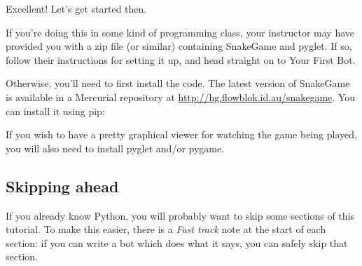 Excellent! Let’s get started then.

If you’re doing this in some kind of programming class, your instructor may have
provided you with a zip file (or similar) containing SnakeGame and pyglet.
If so, follow their instructions for setting it up, and head straight on to
Your First Bot.

Otherwise, you’ll need to first install the code. The latest version of
SnakeGame is available in a Mercurial repository at
\url{http://hg.flowblok.id.au/snakegame}.
You can install it using pip:

If you wish to have a pretty graphical viewer for watching the game being
played, you will also need to install pyglet
and/or pygame.

\subsection{Skipping ahead}

If you already know Python, you will probably want to skip some sections of this
tutorial. To make this easier, there is a \emph{Fast track} note at the start of
each section: if you can write a bot which does what it says, you can safely
skip that section.

